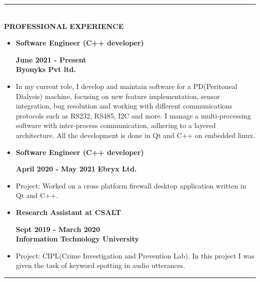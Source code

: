 \documentclass[9pt,a4paper]{article}
\newcommand{\MyHorizontalLine}{\noindent\rule{\linewidth}{1.5pt}\\}
\begin{document}
\MyHorizontalLine
	\textbf{PROFESSIONAL EXPERIENCE}
	\begin{itemize}
		\item \raggedleft\textbf{Software Engineer (C++ developer)}
		\hfill
		\raggedright\textbf{June 2021 - Present}\\
		\textbf{Byonyks Pvt ltd.}
		\item []	\justifying
		In my current role, I develop and maintain software for a PD(Peritoneal Dialysis) machine, focusing
		on new feature implementation, sensor integration, bug resolution and working with different
		communications protocols such as RS232, RS485, I2C and more. I manage a multi-processing
		software with inter-process communication, adhering to a layered architecture. All the development
		is done in Qt and C++ on embedded linux.
		\item \raggedleft\textbf{Software Engineer (C++ developer)}
		\hfill
		\raggedright\textbf{April 2020 - May 2021}
		\textbf{Ebryx Ltd.}\\
		\item[]\justifying
		Project: Worked on a cross platform firewall desktop application written in Qt and C++.
		\item \raggedleft\textbf{Research Assistant at CSALT}
		\hfill
		\raggedright\textbf{Sept 2019 - March 2020}\\
		\textbf{Information Technology University}
		\item[]\justifying
		Project: CIPL(Crime Investigation and Prevention Lab). In this project I was given the task of keyword spotting in audio utterances.
	\end{itemize}
\MyHorizontalLine
\end{document}
